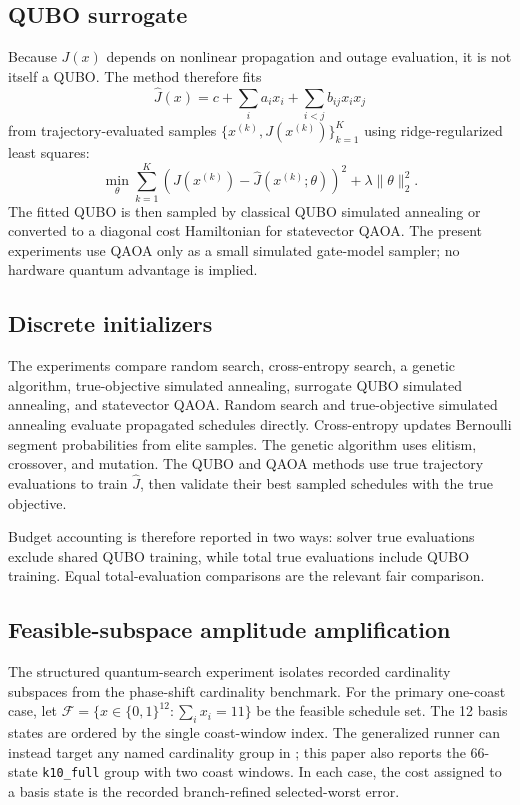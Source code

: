 \documentclass[preprint,12pt]{elsarticle}
\begin{document}
\subsection{QUBO surrogate}

Because $J(x)$ depends on nonlinear propagation and outage evaluation, it is not itself a QUBO. The method therefore fits
\begin{equation}
\widehat{J}(x)=c+\sum_i a_i x_i+\sum_{i<j}b_{ij}x_i x_j
\end{equation}
from trajectory-evaluated samples $\{x^{(k)},J(x^{(k)})\}_{k=1}^{K}$ using ridge-regularized least squares:
\begin{equation}
\min_{\theta}\sum_{k=1}^{K}\left(J(x^{(k)})-\widehat{J}(x^{(k)};\theta)\right)^2
+\lambda\|\theta\|_2^2.
\end{equation}
The fitted QUBO is then sampled by classical QUBO simulated annealing or converted to a diagonal cost Hamiltonian for statevector QAOA. The present experiments use QAOA only as a small simulated gate-model sampler; no hardware quantum advantage is implied.

\subsection{Discrete initializers}

The experiments compare random search, cross-entropy search, a genetic algorithm, true-objective simulated annealing, surrogate QUBO simulated annealing, and statevector QAOA. Random search and true-objective simulated annealing evaluate propagated schedules directly. Cross-entropy updates Bernoulli segment probabilities from elite samples. The genetic algorithm uses elitism, crossover, and mutation. The QUBO and QAOA methods use true trajectory evaluations to train $\widehat{J}$, then validate their best sampled schedules with the true objective.

Budget accounting is therefore reported in two ways: solver true evaluations exclude shared QUBO training, while total true evaluations include QUBO training. Equal total-evaluation comparisons are the relevant fair comparison.

\subsection{Feasible-subspace amplitude amplification}

The structured quantum-search experiment isolates recorded cardinality subspaces from the phase-shift cardinality benchmark. For the primary one-coast case, let $\mathcal{F}=\{x\in\{0,1\}^{12}:\sum_i x_i=11\}$ be the feasible schedule set. The 12 basis states are ordered by the single coast-window index. The generalized runner can instead target any named cardinality group in ; this paper also reports the 66-state \texttt{k10\_full} group with two coast windows. In each case, the cost assigned to a basis state is the recorded branch-refined selected-worst error.
\end{document}
